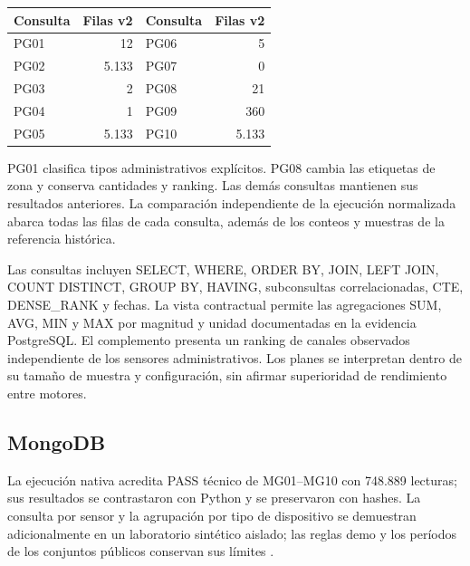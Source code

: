 \begin{center}
\begin{tabular}{lr@{\qquad}lr}
\toprule Consulta & Filas v2 & Consulta & Filas v2 \\
\midrule
PG01 & 12 & PG06 & 5 \\
PG02 & 5.133 & PG07 & 0 \\
PG03 & 2 & PG08 & 21 \\
PG04 & 1 & PG09 & 360 \\
PG05 & 5.133 & PG10 & 5.133 \\
\bottomrule
\end{tabular}
\end{center}

PG01 clasifica tipos administrativos explícitos. PG08 cambia las etiquetas de
zona y conserva cantidades y ranking. Las demás consultas mantienen sus
resultados anteriores. La comparación independiente de la ejecución normalizada
abarca todas las filas de cada consulta, además de los conteos y muestras de la
referencia histórica.

Las consultas incluyen SELECT, WHERE, ORDER BY, JOIN, LEFT JOIN, COUNT DISTINCT,
GROUP BY, HAVING, subconsultas correlacionadas, CTE, DENSE\_RANK y fechas.
La vista contractual permite las agregaciones SUM, AVG, MIN y MAX por magnitud
y unidad documentadas en la evidencia PostgreSQL. El complemento
 presenta un ranking de
canales observados independiente de los sensores administrativos. Los planes
se interpretan dentro de su tamaño de muestra y configuración, sin afirmar
superioridad de rendimiento entre motores.

\subsection{MongoDB}
La ejecución nativa  acredita PASS técnico
de MG01--MG10 con 748.889 lecturas; sus resultados se contrastaron con Python y
se preservaron con hashes. La consulta por sensor y la agrupación por tipo de dispositivo se demuestran
adicionalmente en un laboratorio sintético aislado; las reglas demo y los
períodos de los conjuntos públicos conservan sus límites \cite{mongocierre,laboratorio}.

